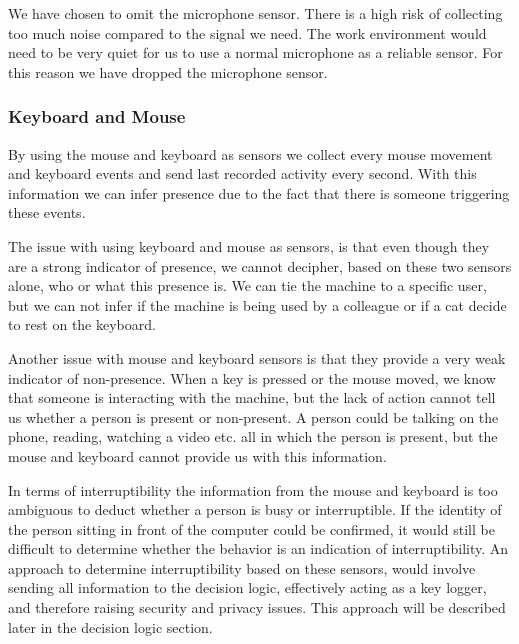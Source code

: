 \documentclass{sigchi}
\begin{document}


We have chosen to omit the microphone sensor.
There is a high risk of collecting too much noise compared to the signal we need.
The work environment would need to be very quiet for us to use a normal microphone as a reliable sensor.
For this reason we have dropped the microphone sensor.

\subsubsection{Keyboard and Mouse}
By using the mouse and keyboard as sensors we collect every mouse movement and keyboard events and send last recorded activity every second.
With this information we can infer presence due to the fact that there is someone triggering these events.

The issue with using keyboard and mouse as sensors, is that even though they are a strong indicator of presence, we cannot decipher, based on these two sensors alone, who or what this presence is.
We can tie the machine to a specific user, but we can not infer if the machine is being used by a colleague or if a cat decide to rest on the keyboard.

Another issue with mouse and keyboard sensors is that they provide a very weak indicator of non-presence.
When a key is pressed or the mouse moved, we know that someone is interacting with the machine, but the lack of action cannot tell us whether a person is present or non-present.
A person could be talking on the phone, reading, watching a video etc. all in which the person is present, but the mouse and keyboard cannot provide us with this information.

In terms of interruptibility the information from the mouse and keyboard is too ambiguous to deduct whether a person is busy or interruptible.
If the identity of the person sitting in front of the computer could be confirmed, it would still be difficult to determine whether the behavior is an indication of interruptibility.
An approach to determine interruptibility based on these sensors, would involve sending all information to the decision logic, effectively acting as a key logger, and therefore raising security and privacy issues.
This approach will be described later in the decision logic section.
\end{document}
